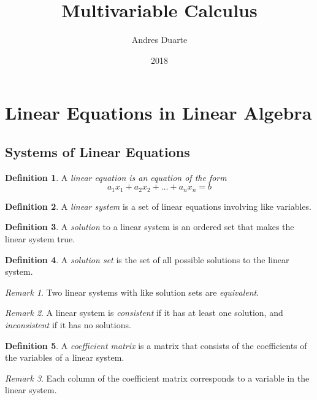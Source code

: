 \documentclass{article}
\title{Multivariable Calculus}
\author{Andres Duarte}
\date{2018}
\theoremstyle{definition}
\newtheorem{definition}{Definition}[section]
\theoremstyle{remark}
\newtheorem*{remark}{Remark}
\theoremstyle{remark}
\theoremstyle{remark}
\newtheorem*{it follows}{It follows}
\begin{document}
\maketitle

\tableofcontents

\newpage

\section{Linear Equations in Linear Algebra}
\subsection{Systems of Linear Equations}

\begin{definition}
  A \textit{linear equation is an equation of the form}
  $$a_1 x_1 + a_2 x_2 + \dots + a_n x_n = b$$
\end{definition}

\begin{definition}
  A \textit{linear system} is a set of linear equations involving like variables.
\end{definition}

\begin{definition}
  A \textit{solution} to a linear system is an ordered set that makes the linear system true.
\end{definition}

\begin{definition}
  A \textit{solution set} is the set of all possible solutions to the linear system.
\end{definition}

\begin{remark}
  Two linear systems with like solution sets are \textit{equivalent}.
\end{remark}

\begin{remark}
  A linear system is \textit{consistent} if it has at least one solution, and \textit{inconsistent} if it has no solutions.
\end{remark}

\begin{definition}
  A \textit{coefficient matrix} is a matrix that consists of the coefficients of the variables of a linear system.
\end{definition}

\begin{remark}
  Each column of the coefficient matrix corresponds to a variable in the linear system.
\end{remark}
\end{document}
